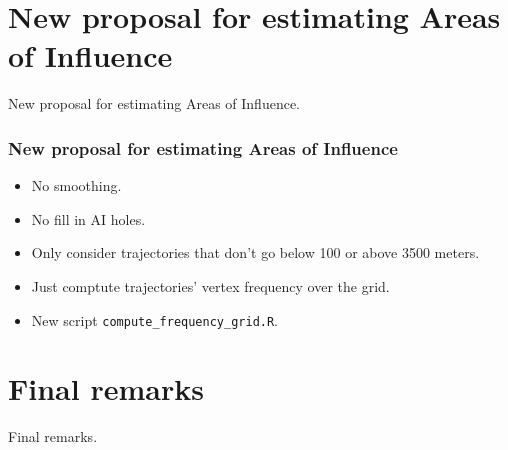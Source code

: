 \documentclass[aspectratio=169]{beamer}
\begin{document}
\section{New proposal for estimating Areas of Influence}



\begin{frame}
    New proposal for estimating Areas of Influence.
\end{frame}

\begin{frame}[fragile]
    \frametitle{New proposal for estimating Areas of Influence}
    \begin{itemize}
        \item No smoothing.
        \item No fill in AI holes.
        \item Only consider trajectories that don't go below 100 or above 3500 
            meters.
        \item Just comptute trajectories' vertex frequency over the grid.
        \item New script \verb|compute_frequency_grid.R|.
    \end{itemize}
\end{frame}



\section{Final remarks}



\begin{frame}
    Final remarks.
\end{frame}
\end{document}
